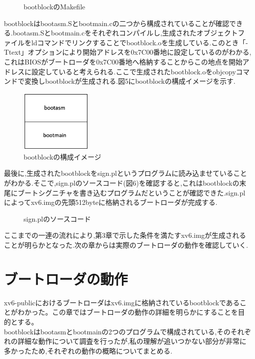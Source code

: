 \documentclass[submit,techreq,noauthor]{eco}	%
\begin{document}
\begin{figure}[H]
    \centering
    \caption{bootblockのMakefile}
    \label{sample}
\end{figure}

bootblockはbootasm.Sとbootmain.cの二つから構成されていることが確認できる.bootasm.Sとbootmain.cをそれぞれコンパイルし,生成されたオブジェクトファイルをldコマンドでリンクすることでbootblock.oを生成している.このとき「-Ttext」オプションにより開始アドレスを0x7C00番地に設定しているのがわかる,これはBIOSがブートローダを0x7C00番地へ格納することからこの地点を開始アドレスに設定していると考えられる.ここで生成されたbootblock.oをobjcopyコマンドで変換しbootblockが生成される.図5にbootblockの構成イメージを示す.

\begin{figure}[H]
    \centering
    \includegraphics[width=3.5cm]{fig/pic4.eps}
    \caption{bootblockの構成イメージ}
    \label{sample}
\end{figure}

最後に,生成されたbootblockをsign.plというプログラムに読み込ませていることがわかる.そこで,sign.plのソースコード(図6)を確認すると,これはbootblockの末尾にブートシグニチャを書き込むプログラムだということが確認できた.sign.plによってxv6.imgの先頭512byteに格納されるブートローダが完成する.

\begin{figure}[H]
    \centering
    \caption{sign.plのソースコード}
    \label{sample}
\end{figure}

ここまでの一連の流れにより,第3章で示した条件を満たすxv6.imgが生成されることが明らかとなった.次の章からは実際のブートローダの動作を確認していく.

\section{ブートローダの動作}
xv6-publicにおけるブートローダはxv6.imgに格納されているbootblockであることがわかった。この章ではブートローダの動作の詳細を明らかにすることを目的とする。\\
bootblockはbootasmとbootmainの2つのプログラムで構成されている,そのそれぞれの詳細な動作について調査を行ったが,私の理解が追いつかない部分が非常に多かったため,それぞれの動作の概略についてまとめる.
\end{document}
